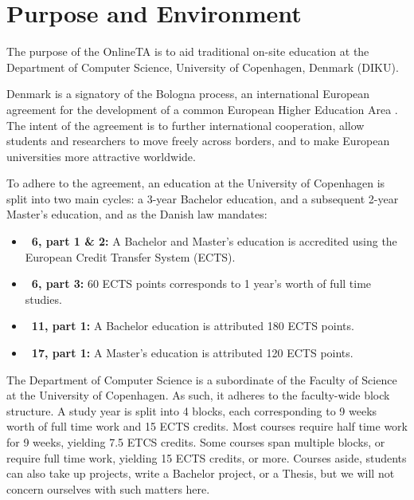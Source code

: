 
\section{Purpose and Environment}

The purpose of the OnlineTA is to aid traditional on-site education at the
Department of Computer Science, University of Copenhagen, Denmark (DIKU).

Denmark is a signatory of the Bologna process, an international European
agreement for the development of a common European Higher Education Area
\cite{ehea1999}. The intent of the agreement is to further international
cooperation, allow students and researchers to move freely across borders, and
to make European universities more attractive worldwide.

To adhere to the agreement, an education at the University of Copenhagen is
split into two main cycles: a 3-year Bachelor education, and a subsequent
2-year Master's education, and as the Danish law \cite{bek814} mandates:

\begin{itemize}

\item \textbf{\textsection\ 6, part 1 \& 2:} A Bachelor and Master's
education is accredited using the European Credit Transfer System (ECTS).

\item \textbf{\textsection\ 6, part 3:} 60 ECTS points corresponds to 1 year's
worth of full time studies. 

\item \textbf{\textsection\ 11, part 1:} A Bachelor education is attributed
180 ECTS points.

\item \textbf{\textsection\ 17, part 1:} A Master's education is attributed 120
ECTS points.

\end{itemize}

The Department of Computer Science is a subordinate of the Faculty of Science
at the University of Copenhagen. As such, it adheres to the faculty-wide block
structure\cite{cnd2004}. A study year is split into 4 blocks, each
corresponding to 9 weeks worth of full time work and 15 ECTS credits. Most
courses require half time work for 9 weeks, yielding 7.5 ETCS credits. Some
courses span multiple blocks, or require full time work, yielding 15 ECTS
credits, or more. Courses aside, students can also take up projects, write a
Bachelor project, or a Thesis, but we will not concern ourselves with such
matters here.

